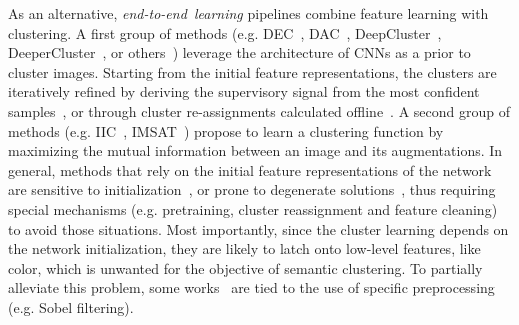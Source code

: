 \documentclass[runningheads]{llncs}
\begin{document}
As an alternative, \textit{end-to-end~learning} pipelines combine feature learning with clustering. A first group of methods (e.g. DEC~\cite{DEC}, DAC~\cite{DAC}, DeepCluster~\cite{DeepCluster}, DeeperCluster~\cite{DeeperCluster}, or others~\cite{asano20self,haeusser2018associative,yang2016joint}) leverage the architecture of CNNs as a prior to cluster images. Starting from the initial feature representations, the clusters are iteratively refined by deriving the supervisory signal from the most confident samples~\cite{DAC,DEC}, or through cluster re-assignments calculated offline~\cite{DeepCluster,DeeperCluster}. A second group of methods (e.g. IIC~\cite{IIC}, IMSAT~\cite{hu2017learning}) propose to learn a clustering function by maximizing the mutual information between an image and its augmentations.  
In general, methods that rely on the initial feature representations of the network are sensitive to initialization~\cite{DAC,DEC,DeepCluster,DeeperCluster,huang2019unsupervised,haeusser2018associative,yang2016joint}, or prone to degenerate solutions~\cite{DeepCluster,DeeperCluster}, thus requiring special mechanisms (e.g. pretraining, cluster reassignment and feature cleaning) to avoid those situations. Most importantly, since the cluster learning depends on the network initialization, they are likely to latch onto low-level features, like color, which is unwanted for the objective of semantic clustering. To partially alleviate this problem, some works~\cite{IIC,hu2017learning,DeepCluster} are tied to the use of specific preprocessing (e.g. Sobel filtering). 
\end{document}
